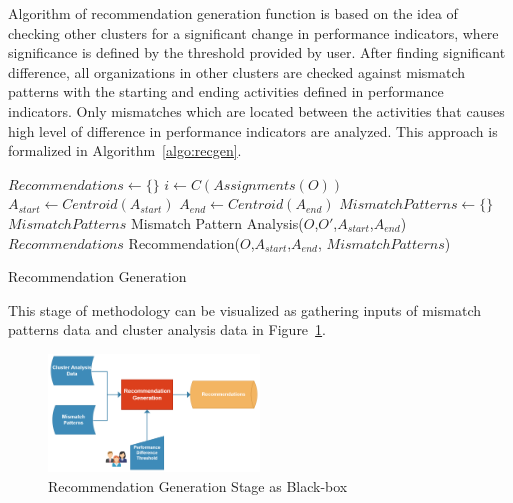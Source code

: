 Algorithm of recommendation generation function is based on the idea of checking other clusters for a significant change in performance indicators, where significance is defined by the threshold provided by user. After finding significant difference, all organizations in other clusters are checked against mismatch patterns with the starting and ending activities defined in performance indicators. Only mismatches which are located between the activities that causes high level of difference in performance indicators are analyzed. This approach is formalized in Algorithm~\ref{algo:recgen}.
 \begin{algorithm}
\DontPrintSemicolon %
$Recommendations \leftarrow \{\}$ \;
$i \leftarrow C(Assignments(O))$ \;
 { 
   { 
     {
       {
        $A_{start} \leftarrow Centroid(A_{start})$ \;
        $A_{end} \leftarrow Centroid(A_{end})$ \;
        $MismatchPatterns \leftarrow \{\}$ \;
         {
          $MismatchPatterns$ \leftarrow  Mismatch Pattern Analysis($O$,$O'$,$A_{start}$,$A_{end}$) \;
        }
        $Recommendations$ \leftarrow  Recommendation($O$,$A_{start}$,$A_{end}$, $MismatchPatterns$) \;
      }
    }
  }
}
 \;
\caption{Recommendation Generation}
\label{algo:recgen}
\end{algorithm}
This stage of methodology can be visualized as gathering inputs of mismatch patterns data and cluster analysis data in Figure~\ref{fig:recommendation-generation-blackox}.
\begin{figure}
  \centering
  \includegraphics[width=0.5\textwidth]{4_methodology/recommendation-generation-blackbox}
  \caption{Recommendation Generation Stage as Black-box}
  \label{fig:recommendation-generation-blackox}
\end{figure}

